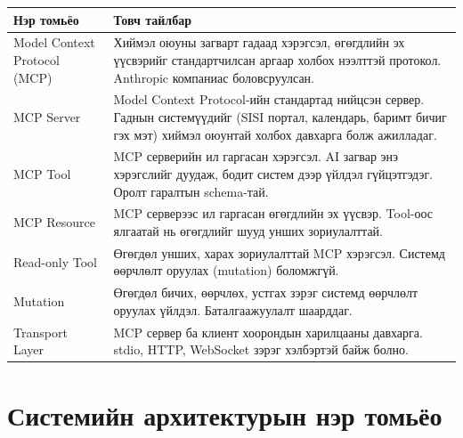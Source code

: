 \begin{table}[H]
  \centering
  \begin{tabularx}{\textwidth}{>{\raggedright\arraybackslash}p{4.5cm} X}
    \toprule
    Нэр томьёо & Товч тайлбар \\
    \midrule
    Model Context Protocol (MCP) & Хиймэл оюуны загварт гадаад хэрэгсэл, өгөгдлийн эх үүсвэрийг стандартчилсан аргаар холбох нээлттэй протокол. Anthropic компаниас боловсруулсан. \\
    \addlinespace
    MCP Server & Model Context Protocol-ийн стандартад нийцсэн сервер. Гаднын системүүдийг (SISI портал, календарь, баримт бичиг гэх мэт) хиймэл оюунтай холбох давхарга болж ажилладаг. \\
    \addlinespace
    MCP Tool & MCP серверийн ил гаргасан хэрэгсэл. AI загвар энэ хэрэгслийг дуудаж, бодит систем дээр үйлдэл гүйцэтгэдэг. Оролт гаралтын schema-тай. \\
    \addlinespace
    MCP Resource & MCP серверээс ил гаргасан өгөгдлийн эх үүсвэр. Tool-оос ялгаатай нь өгөгдлийг шууд унших зориулалттай. \\
    \addlinespace
    Read-only Tool & Өгөгдөл унших, харах зориулалттай MCP хэрэгсэл. Системд өөрчлөлт оруулах (mutation) боломжгүй. \\
    \addlinespace
    Mutation & Өгөгдөл бичих, өөрчлөх, устгах зэрэг системд өөрчлөлт оруулах үйлдэл. Баталгаажуулалт шаарддаг. \\
    \addlinespace
    Transport Layer & MCP сервер ба клиент хоорондын харилцааны давхарга. stdio, HTTP, WebSocket зэрэг хэлбэртэй байж болно. \\
    \bottomrule
  \end{tabularx}
\end{table}

\section*{Системийн архитектурын нэр томьёо}

